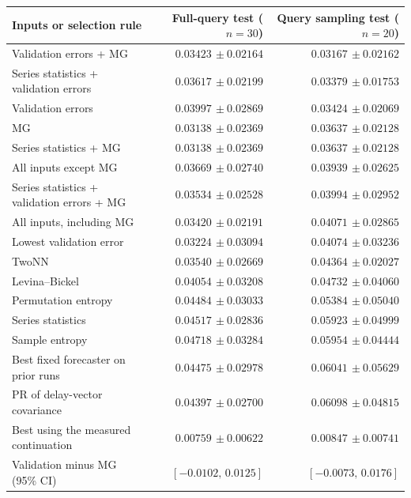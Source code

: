 \begin{tabular}{lrr}
\toprule
Inputs or selection rule & Full-query test ($n=30$) & Query sampling test ($n=20$) \\
\midrule
Validation errors + MG & $0.03423\,\pm 0.02164$ & $0.03167\,\pm 0.02162$ \\
Series statistics + validation errors & $0.03617\,\pm 0.02199$ & $0.03379\,\pm 0.01753$ \\
Validation errors & $0.03997\,\pm 0.02869$ & $0.03424\,\pm 0.02069$ \\
MG & $0.03138\,\pm 0.02369$ & $0.03637\,\pm 0.02128$ \\
Series statistics + MG & $0.03138\,\pm 0.02369$ & $0.03637\,\pm 0.02128$ \\
All inputs except MG & $0.03669\,\pm 0.02740$ & $0.03939\,\pm 0.02625$ \\
Series statistics + validation errors + MG & $0.03534\,\pm 0.02528$ & $0.03994\,\pm 0.02952$ \\
All inputs, including MG & $0.03420\,\pm 0.02191$ & $0.04071\,\pm 0.02865$ \\
Lowest validation error & $0.03224\,\pm 0.03094$ & $0.04074\,\pm 0.03236$ \\
TwoNN & $0.03540\,\pm 0.02669$ & $0.04364\,\pm 0.02027$ \\
Levina--Bickel & $0.04054\,\pm 0.03208$ & $0.04732\,\pm 0.04060$ \\
Permutation entropy & $0.04484\,\pm 0.03033$ & $0.05384\,\pm 0.05040$ \\
Series statistics & $0.04517\,\pm 0.02836$ & $0.05923\,\pm 0.04999$ \\
Sample entropy & $0.04718\,\pm 0.03284$ & $0.05954\,\pm 0.04444$ \\
Best fixed forecaster on prior runs & $0.04475\,\pm 0.02978$ & $0.06041\,\pm 0.05629$ \\
PR of delay-vector covariance & $0.04397\,\pm 0.02700$ & $0.06098\,\pm 0.04815$ \\
\addlinespace
Best using the measured continuation & $0.00759\,\pm 0.00622$ & $0.00847\,\pm 0.00741$ \\
\addlinespace
Validation minus MG (95\% CI)
 & $[-0.0102,\,0.0125]$
 & $[-0.0073,\,0.0176]$ \\
\bottomrule
\end{tabular}
